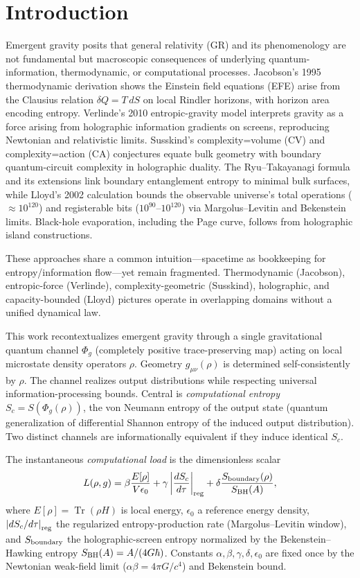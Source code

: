 \documentclass[reprint,amsmath,amssymb,aps,prd,preprintnumbers,superscriptaddress,longbibliography,10pt]{revtex4-2}
\begin{document}
\section{Introduction}
Emergent gravity posits that general relativity (GR) and its phenomenology are not fundamental but macroscopic consequences of underlying quantum-information, thermodynamic, or computational processes. Jacobson's 1995 thermodynamic derivation shows the Einstein field equations (EFE) arise from the Clausius relation \(\delta Q = T\, dS\) on local Rindler horizons, with horizon area encoding entropy. Verlinde's 2010 entropic-gravity model interprets gravity as a force arising from holographic information gradients on screens, reproducing Newtonian and relativistic limits. Susskind's complexity=volume (CV) and complexity=action (CA) conjectures equate bulk geometry with boundary quantum-circuit complexity in holographic duality. The Ryu–Takayanagi formula and its extensions link boundary entanglement entropy to minimal bulk surfaces, while Lloyd's 2002 calculation bounds the observable universe's total operations (\(\approx 10^{120}\)) and registerable bits (\(10^{90}\)–\(10^{120}\)) via Margolus–Levitin and Bekenstein limits. Black-hole evaporation, including the Page curve, follows from holographic island constructions.

These approaches share a common intuition—spacetime as bookkeeping for entropy/information flow—yet remain fragmented. Thermodynamic (Jacobson), entropic-force (Verlinde), complexity-geometric (Susskind), holographic, and capacity-bounded (Lloyd) pictures operate in overlapping domains without a unified dynamical law.

This work recontextualizes emergent gravity through a single gravitational quantum channel \(\Phi_g\) (completely positive trace-preserving map) acting on local microstate density operators \(\rho\). Geometry \(g_{\mu\nu}(\rho)\) is determined self-consistently by \(\rho\). The channel realizes output distributions while respecting universal information-processing bounds. Central is \emph{computational entropy} \(S_c = S(\Phi_g(\rho))\), the von Neumann entropy of the output state (quantum generalization of differential Shannon entropy of the induced output distribution). Two distinct channels are informationally equivalent if they induce identical \(S_c\).

The instantaneous \emph{computational load} is the dimensionless scalar
\[
L(\rho,g) = \beta \frac{E[\rho]}{V \epsilon_0} + \gamma \left| \frac{d S_c}{d\tau} \right|_{\rm reg} + \delta \frac{S_{\rm boundary}(\rho)}{S_{\rm BH}(A)},
\]
where \(E[\rho] = \operatorname{Tr}(\rho H)\) is local energy, \(\epsilon_0\) a reference energy density, \(\left| dS_c/d\tau \right|_{\rm reg}\) the regularized entropy-production rate (Margolus–Levitin window), and \(S_{\rm boundary}\) the holographic-screen entropy normalized by the Bekenstein–Hawking entropy \(S_{\rm BH}(A) = A/(4G\hbar)\). Constants \(\alpha,\beta,\gamma,\delta,\epsilon_0\) are fixed once by the Newtonian weak-field limit (\(\alpha\beta = 4\pi G/c^4\)) and Bekenstein bound.
\end{document}
